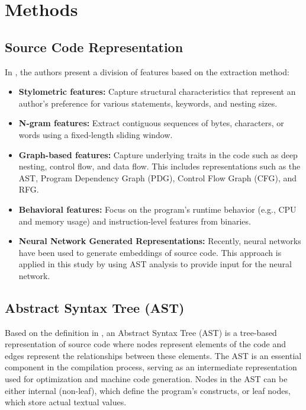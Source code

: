 \documentclass[conference]{IEEEtran}
\begin{document}
\section{Methods}

\subsection{Source Code Representation}

In \cite{information}, the authors present a division of features based on the extraction method:
\begin{itemize}
    \item \textbf{Stylometric features:} Capture structural characteristics that represent an author’s preference for various statements, keywords, 
    and nesting sizes.
    \item \textbf{N-gram features:} Extract contiguous sequences of bytes, characters, or words using a fixed-length sliding window.
    \item \textbf{Graph-based features:} Capture underlying traits in the code such as deep nesting, control flow, and data flow. This includes 
    representations such as the AST, Program Dependency Graph (PDG), Control Flow Graph (CFG), and RFG.
    \item \textbf{Behavioral features:} Focus on the program’s runtime behavior (e.g., CPU and memory usage) and instruction-level features from binaries.
    \item \textbf{Neural Network Generated Representations:} Recently, neural networks have been used to generate embeddings of source code. This approach 
    is applied in this study by using AST analysis to provide input for the neural network.
\end{itemize}

\subsection{Abstract Syntax Tree (AST)}

Based on the definition in \cite{sun2023AST}, an Abstract Syntax Tree (AST) is a tree-based representation of source code where nodes represent elements of the code and edges represent the relationships between these elements. The AST is an essential component in the compilation process, serving as an intermediate representation used for optimization and machine code generation. Nodes in the AST can be either internal (non-leaf), which define the program's constructs, or leaf nodes, which store actual textual values.
\end{document}

